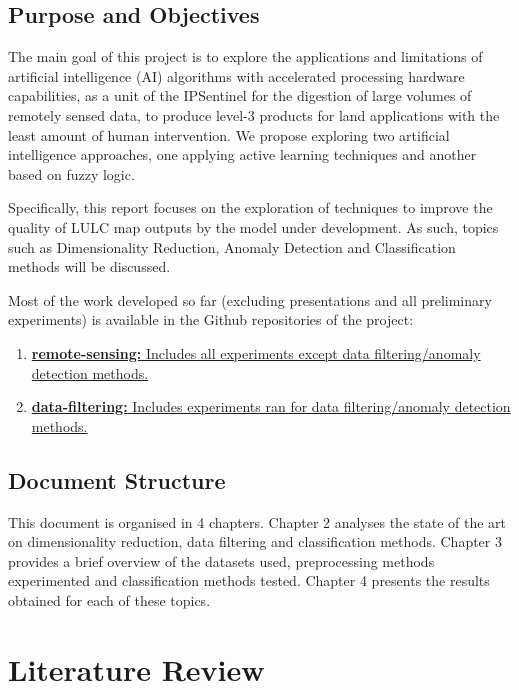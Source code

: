 \documentclass[12pt, english, openany]{book}
\begin{document}
\section{Purpose and Objectives}

The main goal of this project is to explore the applications and limitations of
artificial intelligence (AI) algorithms with accelerated processing hardware
capabilities, as a unit of the IPSentinel for the digestion of large volumes of
remotely sensed data, to produce level-3 products for land applications with
the least amount of human intervention. We propose exploring two artificial
intelligence approaches, one applying active learning techniques and another
based on fuzzy logic.

Specifically, this report focuses on the exploration of techniques to
improve the quality of LULC map outputs by the model under development. As
such, topics such as Dimensionality Reduction, Anomaly Detection and
Classification methods will be discussed.

Most of the work developed so far (excluding presentations and all preliminary
experiments) is available in the Github repositories of the project:
\begin{enumerate}
  \item \href{https://github.com/joaopfonseca/remote_sensing}{
  \textbf{remote-sensing:} Includes all experiments except data
  filtering/anomaly detection methods.}
  \item \href{https://github.com/joaopfonseca/data-filtering}{
  \textbf{data-filtering:} Includes experiments ran for data filtering/anomaly
  detection methods.}
\end{enumerate}


\section{Document Structure}

This document is organised in 4 chapters. Chapter 2 analyses the state of the
art on dimensionality reduction, data filtering and classification methods.
Chapter 3 provides a brief overview of the datasets used, preprocessing methods
experimented and classification methods tested. Chapter 4 presents the results
obtained for each of these topics.

\chapter{Literature Review}
\end{document}
